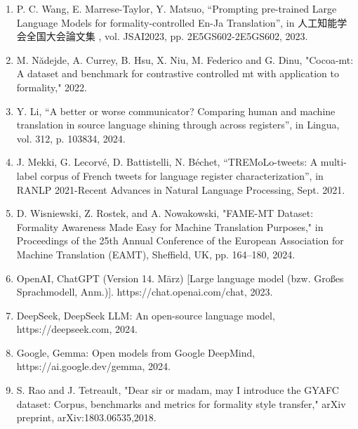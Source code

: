 \documentclass[fleqn,moreauthors,10pt]{ds_report}
\begin{document}
		
		
		\renewcommand{\labelenumi}{[\theenumi]}
		\begin{CJK*}
		\begin{enumerate}
			\item  P. C. Wang, E. Marrese-Taylor, Y. Matsuo, “Prompting pre-trained Large Language Models for formality-controlled En-Ja Translation”, in 人工知能学会全国大会論文集 , vol. JSAI2023, pp. 2E5GS602-2E5GS602, 2023.
			\item M. N\u{a}dejde, A. Currey, B. Hsu, X. Niu, M. Federico and G. Dinu, "Cocoa-mt: A dataset and benchmark for contrastive controlled mt with application to formality," 2022.
			\item Y. Li, “A better or worse communicator? Comparing human and machine translation in source language shining through across registers”, in Lingua, vol. 312, p. 103834, 2024.
			\item J. Mekki, G. Lecorvé, D. Battistelli, N. Béchet, “TREMoLo-tweets: A multi-label corpus of French tweets for language register characterization”, in RANLP 2021-Recent Advances in Natural Language Processing, Sept. 2021.
			\item D. Wisniewski, Z. Rostek, and A. Nowakowski, "FAME-MT Dataset: Formality Awareness Made Easy for Machine Translation Purposes," in Proceedings of the 25th Annual Conference of the European Association for Machine Translation (EAMT), Sheffield, UK, pp. 164–180, 2024.
			\item OpenAI, ChatGPT (Version 14. März) [Large language model (bzw. Großes Sprachmodell, Anm.)]. https://chat.openai.com/chat, 2023.
			\item DeepSeek, DeepSeek LLM: An open-source language model, https://deepseek.com, 2024.
			\item Google, Gemma: Open models from Google DeepMind, https://ai.google.dev/gemma, 2024.
			\item S. Rao and J. Tetreault, "Dear sir or madam, may I introduce the GYAFC dataset: Corpus, benchmarks and metrics for formality style transfer," arXiv preprint, arXiv:1803.06535,2018.
		\end{enumerate}
	\end{CJK*}
		
	
\end{document}
